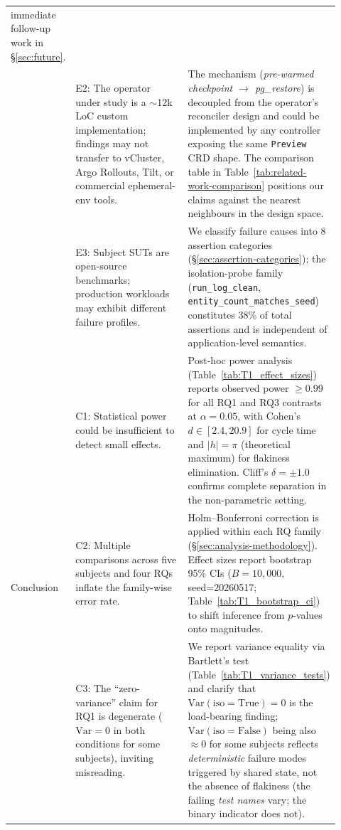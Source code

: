 \begin{table}[t]
\begin{tabular}{p{0.10\linewidth} p{0.36\linewidth} p{0.46\linewidth}}
   immediate follow-up work in \S\ref{sec:future}. \\
 & E2: The operator under study is a $\sim$12k LoC custom implementation;
   findings may not transfer to vCluster, Argo Rollouts, Tilt, or
   commercial ephemeral-env tools.
 & The mechanism (\emph{pre-warmed checkpoint $\rightarrow$ pg\_restore})
   is decoupled from the operator's reconciler design and could be
   implemented by any controller exposing the same \texttt{Preview} CRD shape.
   The comparison table in
   Table~\ref{tab:related-work-comparison} positions our claims against the
   nearest neighbours in the design space. \\
 & E3: Subject SUTs are open-source benchmarks; production workloads
   may exhibit different failure profiles.
 & We classify failure causes into 8 assertion categories
   (\S\ref{sec:assertion-categories}); the isolation-probe family
   (\texttt{run\_log\_clean}, \texttt{entity\_count\_matches\_seed})
   constitutes 38\% of total assertions and is independent of
   application-level semantics. \\
\hline
\multirow{3}{*}{Conclusion}
 & C1: Statistical power could be insufficient to detect small effects.
 & Post-hoc power analysis (Table~\ref{tab:T1_effect_sizes}) reports
   observed power $\ge 0.99$ for all RQ1 and RQ3 contrasts at
   $\alpha=0.05$, with Cohen's $d \in [2.4, 20.9]$ for cycle time and
   $|h|=\pi$ (theoretical maximum) for flakiness elimination. Cliff's
   $\delta = \pm 1.0$ confirms complete separation in the
   non-parametric setting. \\
 & C2: Multiple comparisons across five subjects and four RQs inflate
   the family-wise error rate.
 & Holm--Bonferroni correction is applied within each RQ family
   (\S\ref{sec:analysis-methodology}). Effect sizes report bootstrap 95\%
   CIs ($B=10{,}000$, seed=20260517; Table~\ref{tab:T1_bootstrap_ci}) to
   shift inference from $p$-values onto magnitudes. \\
 & C3: The ``zero-variance'' claim for RQ1 is degenerate
   ($\mathrm{Var}=0$ in both conditions for some subjects), inviting
   misreading.
 & We report variance equality via Bartlett's test
   (Table~\ref{tab:T1_variance_tests}) and clarify that
   $\mathrm{Var}(\text{iso}=\text{True})=0$ is the load-bearing finding;
   $\mathrm{Var}(\text{iso}=\text{False})$ being also $\approx 0$ for some
   subjects reflects \emph{deterministic} failure modes triggered by
   shared state, not the absence of flakiness (the failing
   \emph{test names} vary; the binary indicator does not). \\
\hline
\end{tabular}
\end{table}
